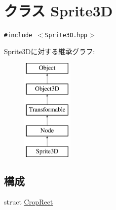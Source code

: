 \hypertarget{classm3g_1_1Sprite3D}{
\section{クラス Sprite3D}
\label{classm3g_1_1Sprite3D}
}
{\tt \#include $<$Sprite3D.hpp$>$}

Sprite3Dに対する継承グラフ:\begin{figure}[H]
\begin{center}
\leavevmode
\includegraphics[height=5cm]{classm3g_1_1Sprite3D}
\end{center}
\end{figure}
\subsection*{構成}
\begin{CompactItemize}
\item 
struct \hyperlink{structm3g_1_1Sprite3D_1_1CropRect}{CropRect}
\end{CompactItemize}
